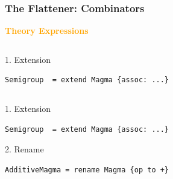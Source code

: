 \documentclass[t,10pt,numbers,fleqn,usenames,xcolor=dvipsnames]{beamer}
\begin{document}
\begin{frame}[fragile] 
\frametitle{The Flattener: Combinators} 
\textcolor{Orange}{\textbf{Theory Expressions}} \vspace{0.2cm}

\begin{overprint}
\begin{columns}
\begin{column}{0.45\textwidth}
\scriptsize{1. Extension}
\begin{verbatim}
Semigroup  = extend Magma {assoc: ...}
\end{verbatim}
\end{column}
\begin{column}{0.45\textwidth}


{\scriptsize
}
\end{column}
\end{columns}

\begin{columns}
\begin{column}{0.45\textwidth}
\scriptsize{1. Extension}
\begin{verbatim}
Semigroup  = extend Magma {assoc: ...}
\end{verbatim}
\vspace{0.3cm}
\scriptsize{2. Rename}
\begin{verbatim}
AdditiveMagma = rename Magma {op to +} 
\end{verbatim}
\end{column}
\begin{column}{0.45\textwidth}
{\scriptsize
}
\end{column}
\end{columns}


\end{overprint}
\end{frame}
\end{document}
